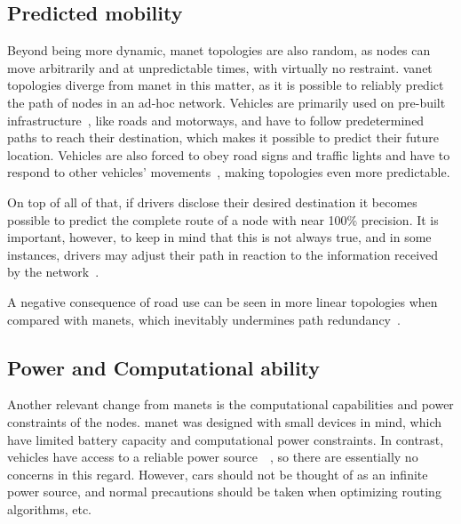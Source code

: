 \subsection{Predicted mobility}
\label{subsec:predicted_mob}

Beyond being more dynamic, \gls{manet} topologies are also random, as nodes can move arbitrarily and at unpredictable times, with virtually no restraint. \gls{vanet} topologies diverge from \gls{manet} in this matter, as it is possible to reliably predict the path of nodes in an ad-hoc network. Vehicles are primarily used on pre-built infrastructure~\cite{liang_vehicular_2015}, like roads and motorways, and have to follow predetermined paths to reach their destination, which makes it possible to predict their future location. Vehicles are also forced to obey road signs and traffic lights and have to respond to other vehicles' movements~\cite{al-sultan_comprehensive_2014}, making topologies even more predictable.

On top of all of that, if drivers disclose their desired destination it becomes possible to predict the complete route of a node with near 100\% precision. It is important, however, to keep in mind that this is not always true, and in some instances, drivers may adjust their path in reaction to the information received by the network~\cite{liang_vehicular_2015}.

A negative consequence of road use can be seen in more linear topologies when compared with \glspl{manet}, which inevitably undermines path redundancy~\cite{toor_vehicle_2008}.

\subsection{Power and Computational ability}
\label{subsec:power_compute}

Another relevant change from \glspl{manet} is the computational capabilities and power constraints of the nodes. \gls{manet} was designed with small devices in mind, which have limited battery capacity and computational power constraints. In contrast, vehicles have access to a reliable power source~\cite{liang_vehicular_2015}~\cite{jakubiak_state_2008}, so there are essentially no concerns in this regard. However, cars should not be thought of as an infinite power source, and normal precautions should be taken when optimizing routing algorithms, etc.

